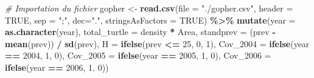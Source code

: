 \documentclass[
]{article}
\newenvironment{Shaded}{\begin{snugshade}}{\end{snugshade}}
\newcommand{\AttributeTok}[1]{\textcolor[rgb]{0.13,0.29,0.53}{#1}}
\newcommand{\CommentTok}[1]{\textcolor[rgb]{0.56,0.35,0.01}{\textit{#1}}}
\newcommand{\ConstantTok}[1]{\textcolor[rgb]{0.56,0.35,0.01}{#1}}
\newcommand{\DecValTok}[1]{\textcolor[rgb]{0.00,0.00,0.81}{#1}}
\newcommand{\FunctionTok}[1]{\textcolor[rgb]{0.13,0.29,0.53}{\textbf{#1}}}
\newcommand{\NormalTok}[1]{#1}
\newcommand{\OtherTok}[1]{\textcolor[rgb]{0.56,0.35,0.01}{#1}}
\newcommand{\SpecialCharTok}[1]{\textcolor[rgb]{0.81,0.36,0.00}{\textbf{#1}}}
\newcommand{\StringTok}[1]{\textcolor[rgb]{0.31,0.60,0.02}{#1}}
\begin{document}
\begin{Shaded}
\begin{Highlighting}[]
\CommentTok{\# Importation du fichier }
\NormalTok{gopher }\OtherTok{\textless{}{-}} \FunctionTok{read.csv}\NormalTok{(}\AttributeTok{file =} \StringTok{"./gopher.csv"}\NormalTok{, }\AttributeTok{header =} \ConstantTok{TRUE}\NormalTok{, }\AttributeTok{sep =} \StringTok{";"}\NormalTok{, }\AttributeTok{dec=}\StringTok{"."}\NormalTok{, }\AttributeTok{stringsAsFactors =} \ConstantTok{TRUE}\NormalTok{) }\SpecialCharTok{\%\textgreater{}\%} 
  \FunctionTok{mutate}\NormalTok{(}\AttributeTok{year =} \FunctionTok{as.character}\NormalTok{(year),}
         \AttributeTok{total\_turtle =}\NormalTok{ density }\SpecialCharTok{*}\NormalTok{ Area,}
         \AttributeTok{standprev =}\NormalTok{ (prev }\SpecialCharTok{{-}} \FunctionTok{mean}\NormalTok{(prev)) }\SpecialCharTok{/} \FunctionTok{sd}\NormalTok{(prev),}
         \AttributeTok{H =} \FunctionTok{ifelse}\NormalTok{(prev }\SpecialCharTok{\textless{}=} \DecValTok{25}\NormalTok{, }\DecValTok{0}\NormalTok{, }\DecValTok{1}\NormalTok{),}
         \AttributeTok{Cov\_2004 =} \FunctionTok{ifelse}\NormalTok{(year }\SpecialCharTok{==} \DecValTok{2004}\NormalTok{, }\DecValTok{1}\NormalTok{, }\DecValTok{0}\NormalTok{),}
         \AttributeTok{Cov\_2005 =} \FunctionTok{ifelse}\NormalTok{(year }\SpecialCharTok{==} \DecValTok{2005}\NormalTok{, }\DecValTok{1}\NormalTok{, }\DecValTok{0}\NormalTok{),}
         \AttributeTok{Cov\_2006 =} \FunctionTok{ifelse}\NormalTok{(year }\SpecialCharTok{==} \DecValTok{2006}\NormalTok{, }\DecValTok{1}\NormalTok{, }\DecValTok{0}\NormalTok{))}
\end{Highlighting}
\end{Shaded}
\end{document}
